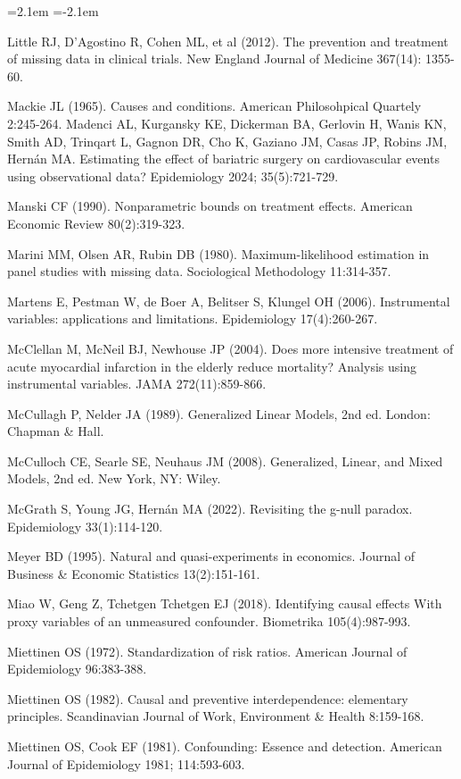 \begin{list}{}{\leftmargin=2.1em   \itemindent=-2.1em \parsep=0pt \itemsep=1.6pt \topsep=4pt \rightmargin=0pt}
\item Little RJ, D'Agostino R, Cohen ML, et al (2012). The prevention and treatment of missing data in clinical trials. New England Journal of Medicine 367(14): 1355-60.
\item Mackie JL (1965). Causes and conditions. American Philosohpical Quartely 2:245-264. Madenci AL, Kurgansky KE, Dickerman BA, Gerlovin H, Wanis KN, Smith AD, Trinqart L, Gagnon DR, Cho K, Gaziano JM, Casas JP, Robins JM, Hernán MA. Estimating the effect of bariatric surgery on cardiovascular events using observational data? Epidemiology 2024; 35(5):721-729.
\item Manski CF (1990). Nonparametric bounds on treatment effects. American Economic Review 80(2):319-323.
\item Marini MM, Olsen AR, Rubin DB (1980). Maximum-likelihood estimation in panel studies with missing data. Sociological Methodology 11:314-357.
\item Martens E, Pestman W, de Boer A, Belitser S, Klungel OH (2006). Instrumental variables: applications and limitations. Epidemiology 17(4):260-267.
\item McClellan M, McNeil BJ, Newhouse JP (2004). Does more intensive treatment of acute myocardial infarction in the elderly reduce mortality? Analysis using instrumental variables. JAMA 272(11):859-866.
\item McCullagh P, Nelder JA (1989). Generalized Linear Models, 2nd ed. London: Chapman \& Hall.
\item McCulloch CE, Searle SE, Neuhaus JM (2008). Generalized, Linear, and Mixed Models, 2nd ed. New York, NY: Wiley.
\item McGrath S, Young JG, Hernán MA (2022). Revisiting the g-null paradox. Epidemiology 33(1):114-120.
\item Meyer BD (1995). Natural and quasi-experiments in economics. Journal of Business \& Economic Statistics 13(2):151-161.
\item Miao W, Geng Z, Tchetgen Tchetgen EJ (2018). Identifying causal effects With proxy variables of an unmeasured confounder. Biometrika 105(4):987-993.
\item Miettinen OS (1972). Standardization of risk ratios. American Journal of Epidemiology 96:383-388.
\item Miettinen OS (1982). Causal and preventive interdependence: elementary principles. Scandinavian Journal of Work, Environment \& Health 8:159-168.
\item Miettinen OS, Cook EF (1981). Confounding: Essence and detection. American Journal of Epidemiology 1981; 114:593-603.

\end{list}
